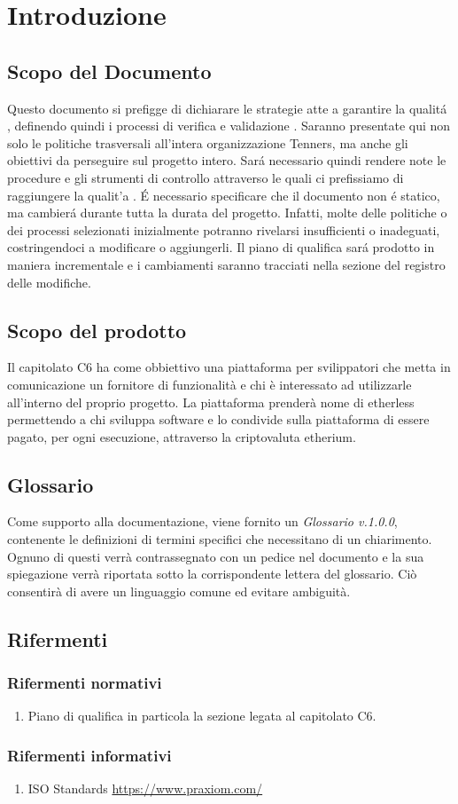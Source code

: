 \section{Introduzione}

\subsection{Scopo del Documento}
Questo documento si prefigge di dichiarare le strategie atte a garantire la qualit\'a \glo, definendo quindi i processi di verifica \glo e validazione \glo. Saranno presentate qui non solo le politiche trasversali all'intera organizzazione Tenners, ma anche gli obiettivi da perseguire sul progetto intero. Sar\'a necessario quindi rendere note le procedure e gli strumenti di controllo attraverso le quali ci prefissiamo di raggiungere la qualit'a \glo.
\'E necessario specificare che il documento non \'e statico, ma cambier\'a durante tutta la durata del progetto. Infatti, molte delle politiche o dei processi selezionati inizialmente potranno rivelarsi insufficienti o inadeguati, costringendoci a modificare o aggiungerli. Il piano di qualifica \glo sar\'a prodotto in maniera incrementale e i cambiamenti saranno tracciati nella sezione del registro delle modifiche.

\subsection{Scopo del prodotto}
Il capitolato C6 ha come obbiettivo una piattaforma per svilippatori che metta
in comunicazione un fornitore di funzionalit\`a e chi \`e interessato ad utilizzarle
all'interno del proprio progetto.
La piattaforma prender\`a nome di etherless permettendo a chi sviluppa software e
lo condivide sulla piattaforma di essere pagato, per ogni esecuzione, attraverso
la criptovaluta etherium.


\subsection{Glossario}
Come supporto alla documentazione, viene fornito un \textit{Glossario v.1.0.0},
contenente le definizioni di termini specifici che necessitano di un chiarimento.
Ognuno di questi verr\`a contrassegnato con un pedice \glo nel documento e la sua
spiegazione verr\`a riportata sotto la corrispondente lettera del glossario. Ci\`o
consentir\`a di avere un linguaggio comune ed evitare ambiguit\`a.

\subsection{Rifermenti}
\subsubsection{Rifermenti normativi}
\begin{enumerate}
  \item Piano di qualifica in particola la sezione legata al capitolato C6.
\end{enumerate}
\subsubsection{Rifermenti informativi}
\begin{enumerate}
  \item ISO Standards
	\url{https://www.praxiom.com/}
\end{enumerate}
